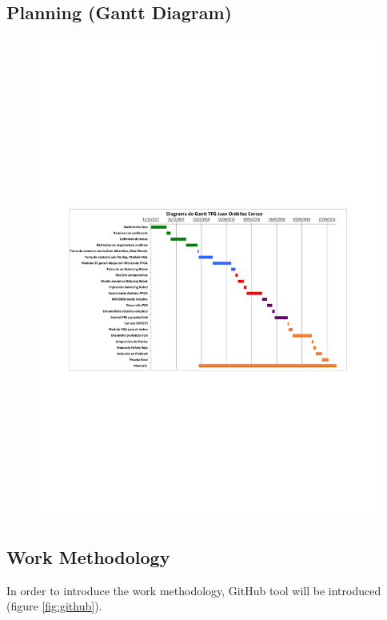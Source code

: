 \subsection{Planning (Gantt Diagram)}

\begin{center}
	\begin{figure}[H]
		\center
		\includegraphics[trim = 15mm 85mm 2cm 100mm,clip, angle=-90, scale = 1]{imagenes/Introduction/Gantt.pdf}
		\label{fig:diagramaGantt}
		\caption{}
	\end{figure}
\end{center}

\subsection{Work Methodology}
In order to introduce the work methodology, GitHub tool will be introduced\cite{Git} (figure \ref{fig:github}).\newline 

